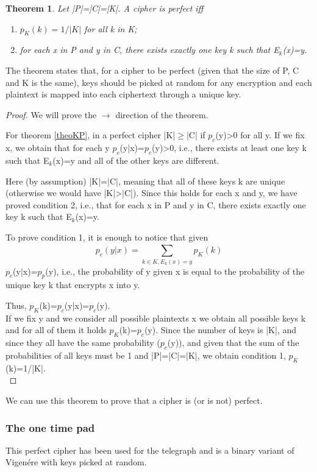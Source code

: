 \documentclass[a4paper, 12pt]{report}
\newtheorem{theorem}{\textbf{Theorem}}
\begin{document}
\begin{theorem}\label{theoperfcipher}
	Let |P|=|C|=|K|. A cipher is perfect iff
	\begin{enumerate}
		\item $p_K(k)=1/|K|$ for all k in K;
		\item for each x in P and y in C, there exists exactly one key k such that E$_k$(x)=y.
	\end{enumerate}
\end{theorem}
The theorem states that, for a cipher to be perfect (given that the size of P, C and K is the same), keys should be picked at random for any encryption and each plaintext is mapped into each ciphertext through a unique key.

\begin{proof}
	We will prove the $\rightarrow$ direction of the theorem.
	
	For theorem \ref{theoKP}, in a perfect cipher |K|$\ge$|C| if $p_c$(y)>0 for all y. If we fix x, we obtain that for each y $p_c$(y|x)=$p_c$(y)>0, i.e., there exists at least one key k such that E$_k$(x)=y and all of the other keys are different.
	
	Here (by assumption) |K|=|C|, meaning that all of these keys k are unique (otherwise we would have |K|>|C|). Since this holds for each x and y, we have proved condition 2, i.e., that for each x in P and y in C, there exists exactly one key k such that E$_k$(x)=y.
	
	To prove condition 1, it is enough to notice that given
	\[p_c(y|x) = \sum_{k\in K,E_k(x)=y}^{}p_K(k)\]
	$p_c$(y|x)=$p_p$(y), i.e., the probability of y given x is equal to the probability of the unique key k that encrypts x into y.
	
	Thus, $p_K$(k)=$p_c$(y|x)=$p_c$(y).\\
	If we fix y and we consider all possible plaintexts x we obtain all possible keys k and for all of them it holds $p_K$(k)=$p_c$(y). Since the number of keys is |K|, and since they all have the same probability ($p_c$(y)), and given that the sum of the probabilities of all keys must be 1 and |P|=|C|=|K|, we obtain condition 1, $p_K$(k)=1/|K|.\\
\end{proof}

We can use this theorem to prove that a cipher is (or is not) perfect.
\subsubsection{The one time pad}
This perfect cipher has been used for the telegraph and is a binary variant of Vigenére with keys picked at random.
\end{document}
